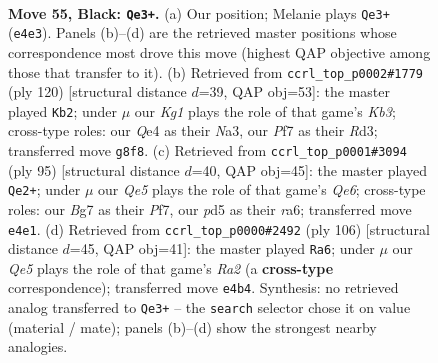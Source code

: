 \documentclass[11pt]{article}
\begin{document}
\clearpage

\begin{figure}[p]\centering
\begin{subfigure}{0.46\textwidth}\centering
\resizebox{\linewidth}{!}{%
\newchessgame
\chessboard[
  setfen={6k1/2n2pb1/7R/3P4/4q3/8/6R1/6K1 b - - 0 55},
  showmover=false,
  pgfstyle=straightmove, color=movearrow, markmove={e4-e3}
]}
\caption{}
\end{subfigure}\hfill
\begin{subfigure}{0.46\textwidth}\centering
\resizebox{\linewidth}{!}{%
\newchessgame
\chessboard[
  setfen={8/7k/8/1p6/1P6/NK1RB1r1/8/2r5 w - - 23 61},
  showmover=false,
  pgfstyle=straightmove, color=movearrow, markmove={b3-b2}
]}
\caption{}
\end{subfigure}
\\[4pt]
\begin{subfigure}{0.46\textwidth}\centering
\resizebox{\linewidth}{!}{%
\newchessgame
\chessboard[
  setfen={8/3R1pk1/R3P1p1/1p6/8/4q3/6K1/8 b - - 3 48},
  showmover=false,
  pgfstyle=straightmove, color=movearrow, markmove={e3-e2}
]}
\caption{}
\end{subfigure}\hfill
\begin{subfigure}{0.46\textwidth}\centering
\resizebox{\linewidth}{!}{%
\newchessgame
\chessboard[
  setfen={6R1/8/3n1k2/6p1/1r6/7P/Rr4BK/8 w - - 4 54},
  showmover=false,
  pgfstyle=straightmove, color=movearrow, markmove={a2-a6}
]}
\caption{}
\end{subfigure}
\caption{\textbf{Move 55, Black: \texttt{Qe3+}.} (a) Our position; Melanie plays \texttt{Qe3+} (\texttt{e4e3}). Panels (b)--(d) are the retrieved master positions whose correspondence most drove this move (highest QAP objective among those that transfer to it). (b) Retrieved from \texttt{ccrl\_top\_p0002\#1779} (ply 120) [structural distance $d$=39, QAP obj=53]: the master played \texttt{Kb2}; under $\mu$ our \emph{Kg1} plays the role of that game's \emph{Kb3}; cross-type roles: our \emph{Q}e4 as their \emph{N}a3, our \emph{P}f7 as their \emph{R}d3; transferred move \texttt{g8f8}. (c) Retrieved from \texttt{ccrl\_top\_p0001\#3094} (ply 95) [structural distance $d$=40, QAP obj=45]: the master played \texttt{Qe2+}; under $\mu$ our \emph{Qe5} plays the role of that game's \emph{Qe6}; cross-type roles: our \emph{B}g7 as their \emph{P}f7, our \emph{p}d5 as their \emph{r}a6; transferred move \texttt{e4e1}. (d) Retrieved from \texttt{ccrl\_top\_p0000\#2492} (ply 106) [structural distance $d$=45, QAP obj=41]: the master played \texttt{Ra6}; under $\mu$ our \emph{Qe5} plays the role of that game's \emph{Ra2} (a \textbf{cross-type} correspondence); transferred move \texttt{e4b4}. Synthesis: no retrieved analog transferred to \texttt{Qe3+} -- the \texttt{search} selector chose it on value (material / mate); panels (b)--(d) show the strongest nearby analogies.}
\label{fig:thought-m109}
\end{figure}
\end{document}
